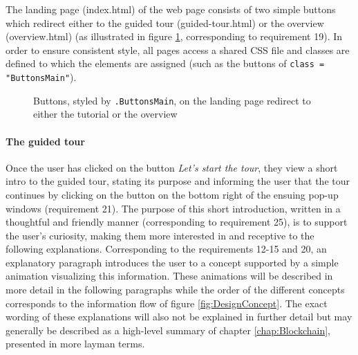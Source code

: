The landing page (index.html) of the web page consists of two simple buttons which redirect either to the guided tour (guided-tour.html) or the overview (overview.html) (as illustrated in figure \ref{fig:ButtonStyle}, corresponding to requirement 19). In order to ensure consistent style, all pages access a shared CSS file and classes are defined to which the elements are assigned (such as the buttons of \texttt{class = "ButtonsMain"}). 

\begin{figure}
    \centering
    
    \caption{Buttons, styled by \texttt{.ButtonsMain}, on the landing page redirect to either the tutorial or the overview}
    \label{fig:ButtonStyle}
\end{figure}

\paragraph{The guided tour} Once the user has clicked on the button \textit{Let's start the tour}, they view a short intro to the guided tour, stating its purpose and informing the user that the tour continues by clicking on the button on the bottom right of the ensuing pop-up windows (requirement 21). The purpose of this short introduction, written in a thoughtful and friendly manner (corresponding to requirement 25), is to support the user's curiosity, making them more interested in and receptive to the following explanations. Corresponding to the requirements 12-15 and 20, an explanatory paragraph introduces the user to a concept supported by a simple animation visualizing this information. These animations will be described in more detail in the following paragraphs while the order of the different concepts corresponds to the information flow of figure \ref{fig:DesignConcept}. The exact wording of these explanations will also not be explained in further detail but may generally be described as a high-level summary of chapter \ref{chap:Blockchain}, presented in more layman terms.

